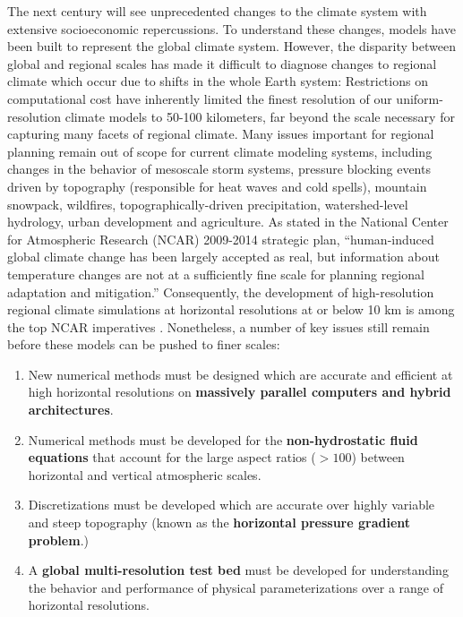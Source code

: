\documentclass[11pt]{article}
\begin{document}
The next century will see unprecedented changes to the climate system with extensive socioeconomic repercussions.  To understand these changes, models have been built to represent the global climate system.  However, the disparity between global and regional scales has made it difficult to diagnose changes to regional climate which occur due to shifts in the whole Earth system:  Restrictions on computational cost have inherently limited the finest resolution of our uniform-resolution climate models to 50-100 kilometers, far beyond the scale necessary for capturing many facets of regional climate.  Many issues important for regional planning remain out of scope for current climate modeling systems, including changes in the behavior of mesoscale storm systems, pressure blocking events driven by topography (responsible for heat waves and cold spells), mountain snowpack, wildfires, topographically-driven precipitation, watershed-level hydrology, urban development and agriculture.  As stated in the National Center for Atmospheric Research (NCAR) 2009-2014 strategic plan, ``human-induced global climate change has been largely accepted as real, but information about temperature changes are not at a sufficiently fine scale for planning regional adaptation and mitigation.'' Consequently, the development of high-resolution regional climate simulations at horizontal resolutions at or below 10 km is among the top NCAR imperatives \citep{NCAR2009STRATEGY}.  Nonetheless, a number of key issues still remain before these models can be pushed to finer scales:
\vspace{-0.4cm}
\begin{enumerate}
\item New numerical methods must be designed which are accurate and efficient at high horizontal resolutions on \textbf{massively parallel computers and hybrid architectures}.

\item Numerical methods must be developed for the \textbf{non-hydrostatic fluid equations} that account for the large aspect ratios ($> 100$) between horizontal and vertical atmospheric scales.

\item Discretizations must be developed which are accurate over highly variable and steep topography (known as the \textbf{horizontal pressure gradient problem}.)

\item A \textbf{global multi-resolution test bed} must be developed for understanding the behavior and performance of physical parameterizations over a range of horizontal resolutions.

\end{enumerate}
\end{document}
